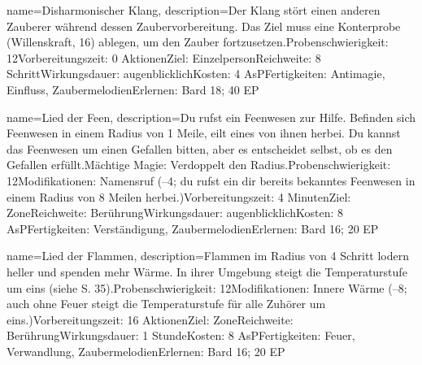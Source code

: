 {
    name={Disharmonischer Klang},
    description={Der Klang stört einen anderen Zauberer während dessen Zaubervorbereitung. Das Ziel muss eine Konterprobe (Willenskraft, 16) ablegen, um den Zauber fortzusetzen.\newline Probenschwierigkeit: 12\newline Vorbereitungszeit: 0 Aktionen\newline Ziel: Einzelperson\newline Reichweite: 8 Schritt\newline Wirkungsdauer: augenblicklich\newline Kosten: 4 AsP\newline Fertigkeiten: Antimagie, Einfluss, Zaubermelodien\newline Erlernen: Bard 18; 40 EP}
}


{
    name={Lied der Feen},
    description={Du rufst ein Feenwesen zur Hilfe. Befinden sich Feenwesen in einem Radius von 1 Meile, eilt eines von ihnen herbei. Du kannst das Feenwesen um einen Gefallen bitten, aber es entscheidet selbst, ob es den Gefallen erfüllt.\newline Mächtige Magie: Verdoppelt den Radius.\newline Probenschwierigkeit: 12\newline Modifikationen: Namensruf (–4; du rufst ein dir bereits bekanntes Feenwesen in einem Radius von 8 Meilen herbei.)\newline Vorbereitungszeit: 4 Minuten\newline Ziel: Zone\newline Reichweite: Berührung\newline Wirkungsdauer: augenblicklich\newline Kosten: 8 AsP\newline Fertigkeiten: Verständigung, Zaubermelodien\newline Erlernen: Bard 16; 20 EP}
}


{
    name={Lied der Flammen},
    description={Flammen im Radius von 4 Schritt lodern heller und spenden mehr Wärme. In ihrer Umgebung steigt die Temperaturstufe um eins (siehe S. 35).\newline Probenschwierigkeit: 12\newline Modifikationen: Innere Wärme (–8; auch ohne Feuer steigt die Temperaturstufe für alle Zuhörer um eins.)\newline Vorbereitungszeit: 16 Aktionen\newline Ziel: Zone\newline Reichweite: Berührung\newline Wirkungsdauer: 1 Stunde\newline Kosten: 8 AsP\newline Fertigkeiten: Feuer, Verwandlung, Zaubermelodien\newline Erlernen: Bard 16; 20 EP}
}


